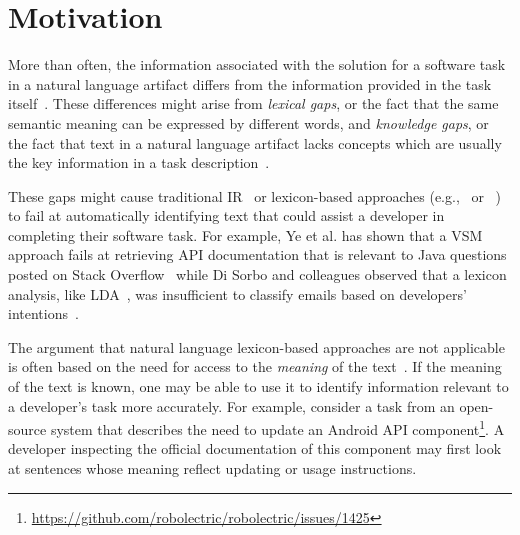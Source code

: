 \section{Motivation}
\label{cp5:motivation}



More than often, the information associated 
with the solution for a software task in a natural language artifact differs from the information provided in the task itself~\cite{silva2019, Ye2016}.
These differences might arise from
\textit{lexical gaps}, or the fact that the same semantic meaning can be expressed by different words, and
\textit{knowledge gaps}, or the fact that text in a natural language artifact lacks concepts which are usually the key information in a task description~\cite{Huang2018}.




These gaps might cause traditional \acf{IR}~\cite{Manning2009IR} or lexicon-based approaches (e.g.,~\cite{Ponzanelli2015} or ~\cite{Xu2017}) to fail at automatically identifying text that could assist a developer in completing their software task. 
For example, Ye et al. has shown that a \acf{VSM}~\cite{salton1975vector} 
approach fails at retrieving API documentation that is relevant to Java questions
posted on Stack Overflow~\cite{Ye2016} while
Di Sorbo and colleagues observed that a lexicon analysis, like \acs{LDA}~\cite{blei2003latent}, was insufficient to classify 
emails based on developers' intentions~\cite{Sorbo2015}.




The argument that natural language lexicon-based approaches are not applicable is often based on the need for access to the \textit{meaning} of the text~\cite{Sorbo2015, gu2015, Arya2019}. If the meaning of the text is known, one may be able to use it to identify information relevant to a developer's task more accurately.
For example, consider a task from an open-source system that describes the need to update an Android API component\footnote{\url{https://github.com/robolectric/robolectric/issues/1425}}. A developer inspecting the official documentation of this component may first look at sentences whose meaning reflect updating or usage instructions.






